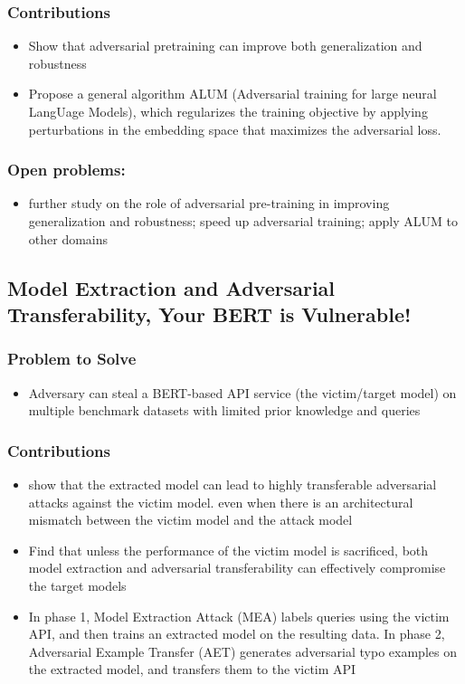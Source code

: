 \documentclass{article}
\begin{document}
\begin{flushleft}
\subsubsection*{Contributions}
\begin{itemize}
 \item Show that adversarial pretraining can improve both generalization and robustness
\item Propose a general algorithm ALUM (Adversarial training for large neural LangUage Models), which regularizes the training objective by applying perturbations in the embedding space that maximizes the adversarial loss.
\end{itemize}

\subsubsection*{Open problems:}
\begin{itemize}
  \item  further study on the role of adversarial pre-training in improving generalization and robustness; speed up adversarial training; apply ALUM to other domains
\end{itemize}




 \subsection{Model Extraction and Adversarial Transferability, Your BERT is Vulnerable!  \cite{}} 
\subsubsection*{Problem to Solve}
\begin{itemize}
    \item Adversary can steal a BERT-based API service (the victim/target model) on multiple benchmark datasets with limited prior knowledge and queries
\end{itemize}

\subsubsection*{Contributions}
\begin{itemize}
 \item show that the extracted model can lead to highly transferable adversarial attacks against the victim model.  even when there is an architectural mismatch between the victim model and the attack model
 \item Find that unless the performance of the victim model is sacrificed, both model extraction and adversarial transferability can effectively compromise the target models
 \item In phase 1, Model Extraction Attack (MEA) labels queries using the victim API, and then trains an extracted model on the resulting data. In phase 2, Adversarial Example Transfer (AET) generates adversarial typo examples on the extracted model, and transfers them to the victim API
\end{itemize}


\end{flushleft}
\end{document}
